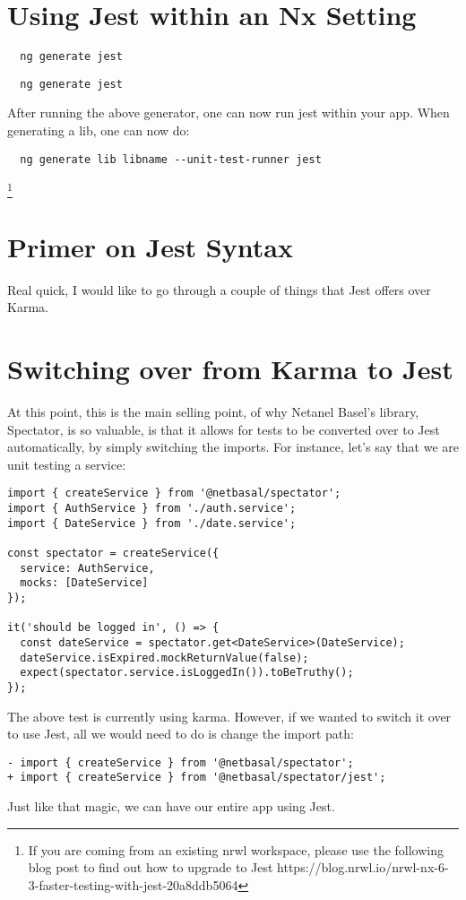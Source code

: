 \section{ Using Jest within an Nx Setting }
\begin{verbatim}
  ng generate jest
\end{verbatim}

\begin{verbatim}
  ng generate jest
\end{verbatim}

After running the above generator, one can now run jest within your app. When
generating a lib, one can now do:
\begin{verbatim}
  ng generate lib libname --unit-test-runner jest
\end{verbatim}

\footnote{If you are coming from an existing nrwl workspace, please use the
following blog post to find out how to upgrade to Jest https://blog.nrwl.io/nrwl-nx-6-3-faster-testing-with-jest-20a8ddb5064}

\section{ Primer on Jest Syntax }
Real quick, I would like to go through a couple of things that Jest offers over
Karma.

\section{Switching over from Karma to Jest}
At this point, this is the main selling point, of why Netanel Basel's
library, Spectator, is so valuable, is that it allows for tests to be converted
over to Jest automatically, by simply switching the imports. For instance, let's
say that we are unit testing a service:
\begin{lstlisting}
import { createService } from '@netbasal/spectator';
import { AuthService } from './auth.service';
import { DateService } from './date.service';

const spectator = createService({
  service: AuthService,
  mocks: [DateService]
});

it('should be logged in', () => {
  const dateService = spectator.get<DateService>(DateService);
  dateService.isExpired.mockReturnValue(false);
  expect(spectator.service.isLoggedIn()).toBeTruthy();
});
\end{lstlisting}

The above test is currently using karma. However, if we wanted to switch it over
to use Jest, all we would need to do is change the import path:
\begin{verbatim}
- import { createService } from '@netbasal/spectator';
+ import { createService } from '@netbasal/spectator/jest';
\end{verbatim}

Just like that magic, we can have our entire app using Jest. 
